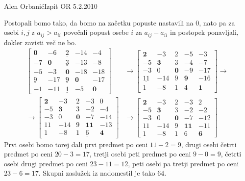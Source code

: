 \begin{naloga}{Alen Orbanić}{Izpit OR 5.2.2010}
\begin{odgovor}
Postopali bomo tako, da bomo na začetku popuste nastavili na $0$,
nato pa za osebi $i, j$ z $a_{ij} > a_{ii}$
povečali popust osebe $i$ za $a_{ij} - a_{ii}$ in postopek ponavljali,
dokler zavisti več ne bo.
\begin{align*}
\begin{bmatrix}
 \mathbf{0} &  -6 & \underline{2} & -14 &  -4 \\
-7 &   \mathbf{0} & \underline{3} & -13 &  -8 \\
-5 &  -3 & \mathbf{0} & -18 & -18 \\
\underline{9} & -17 & \underline{9} &   \mathbf{0} & -17 \\
-1 & -11 & \underline{1} &  -5 &   \mathbf{0}
\end{bmatrix}
&\to
\begin{bmatrix}
 \mathbf{2} &  -3 & 2 & -5 &  -3 \\
-5 &   \mathbf{3} & 3 & -4 &  -7 \\
-3 &   0 & \mathbf{0} & -9 & -17 \\
\underline{11} & -14 & 9 &  \mathbf{9} & -16 \\
 1 &  -8 & 1 &  \underline{4} &   \mathbf{1}
\end{bmatrix}
\to \\ \to
\begin{bmatrix}
 \mathbf{2} &  -3 & 2 & -3 &   0 \\
-5 &   \mathbf{3} & 3 & -2 &  -4 \\
-3 &   0 & \mathbf{0} & -7 & -14 \\
11 & -14 & 9 &  \mathbf{11} & -13 \\
 1 &  -8 & 1 &  \underline{6} &   \mathbf{4}
\end{bmatrix}
&\to
\begin{bmatrix}
 \mathbf{2} &  -3 & 2 & -3 &   2 \\
-5 &   \mathbf{3} & 3 & -2 &  -2 \\
-3 &   0 & \mathbf{0} & -7 & -12 \\
11 & -14 & 9 &  \mathbf{11} & -11 \\
 1 &  -8 & 1 &  6 &   \mathbf{6}
\end{bmatrix}
\end{align*}
Prvi osebi bomo torej dali prvi predmet po ceni $11 - 2 = 9$,
drugi osebi četrti predmet po ceni $20 - 3 = 17$,
tretji osebi peti predmet po ceni $9 - 0 = 9$,
četrti osebi drugi predmet po ceni $23 - 11 = 12$,
peti osebi pa tretji predmet po ceni $23 - 6 = 17$.
Skupni zaslužek iz nadomestil je tako $64$.
\end{odgovor}
\end{naloga}
